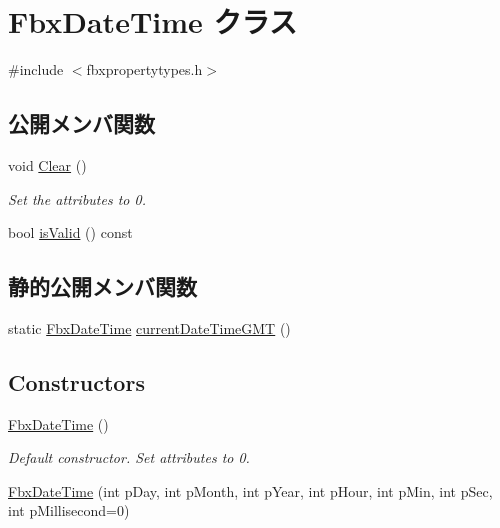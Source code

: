 \hypertarget{class_fbx_date_time}{}\section{Fbx\+Date\+Time クラス}
\label{class_fbx_date_time}


{\ttfamily \#include $<$fbxpropertytypes.\+h$>$}

\subsection*{公開メンバ関数}
\begin{DoxyCompactItemize}
\item 
void \hyperlink{class_fbx_date_time_a56d994c06a311b0cb0007afea1ed24c4}{Clear} ()
\begin{DoxyCompactList}\small\item\em Set the attributes to 0. \end{DoxyCompactList}\item 
bool \hyperlink{class_fbx_date_time_aa48abe1aea0780b94d0db51de1d3fcde}{is\+Valid} () const
\end{DoxyCompactItemize}
\subsection*{静的公開メンバ関数}
\begin{DoxyCompactItemize}
\item 
static \hyperlink{class_fbx_date_time}{Fbx\+Date\+Time} \hyperlink{class_fbx_date_time_aa5ad0089f7a32226d003c1785250a274}{current\+Date\+Time\+G\+MT} ()
\end{DoxyCompactItemize}
\subsection*{Constructors}
\begin{DoxyCompactItemize}
\item 
\hyperlink{class_fbx_date_time_a52200472ed4fb706c9c1e376e92732ce}{Fbx\+Date\+Time} ()
\begin{DoxyCompactList}\small\item\em Default constructor. Set attributes to 0. \end{DoxyCompactList}\item 
\hyperlink{class_fbx_date_time_a78faa8aca65f60e3238cdbf2d1fa5034}{Fbx\+Date\+Time} (int p\+Day, int p\+Month, int p\+Year, int p\+Hour, int p\+Min, int p\+Sec, int p\+Millisecond=0)
\end{DoxyCompactItemize}
